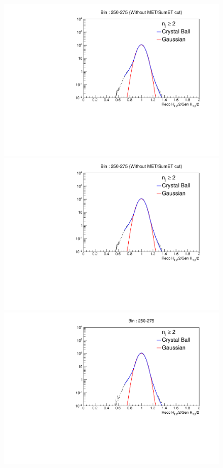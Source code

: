 \begin{figure}[!htbp]
  \begin{center}
    \includegraphics[scale = 0.41]{Plots_HT_2_150/Fit_Res_2_final_crystal_genbin_250-275_crystal_nomet.pdf}%
    \includegraphics[scale = 0.41]{Plots_HT_2_150/Fit_Res_2_final_crystal_genbin_250-275_crystal_nomet.pdf}
    \includegraphics[scale = 0.41]{Plots_HT_2_150/Fit_Res_2_final_crystal_genbin_250-275_crystal.pdf}%

\end{center}
\end{figure}
